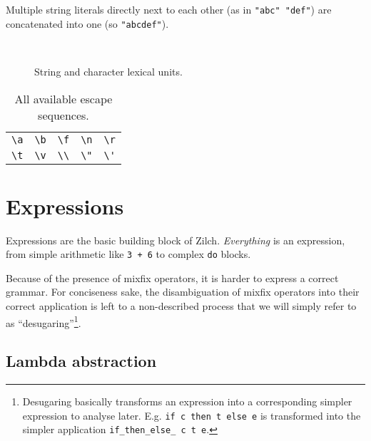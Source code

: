 Multiple string literals directly next to each other (as in \verb|"abc" "def"|) are concatenated into one (so \verb|"abcdef"|).

\begin{figure}[H]
  \centering

  \\

  \caption{String and character lexical units.}
  \label{fig:zilch-grammar-lexical-strings-grammar}
\end{figure}

\begin{table}[htb]
  \begin{tabularx}{\textwidth}{*{5}{Y}}
    \toprule
    \verb|\a| & \verb|\b| & \verb|\f| & \verb|\n| & \verb|\r| \\
    \verb|\t| & \verb|\v| & \verb|\\| & \verb|\"| & \verb|\'| \\
    \bottomrule
  \end{tabularx}

  \caption{All available escape sequences.}
  \label{table:zilch-grammar-lexical-strings-escapesequences}
\end{table}

\section{Expressions}\label{sec:zilch-grammar-expressions}

Expressions are the basic building block of Zilch.
\textit{Everything} is an expression, from simple arithmetic like \texttt{3 + 6} to complex \texttt{do} blocks.

Because of the presence of mixfix operators, it is harder to express a correct grammar.
For conciseness sake, the disambiguation of mixfix operators into their correct application is left to a non-described process that we will simply refer to as ``desugaring''\footnote{Desugaring basically transforms an expression into a corresponding simpler expression to analyse later. E.g. \texttt{if c then t else e} is transformed into the simpler application \texttt{if\_then\_else\_ c t e}.}.

\subsection{Lambda abstraction}\label{subsec:zilch-grammar-expressions-lambda}

